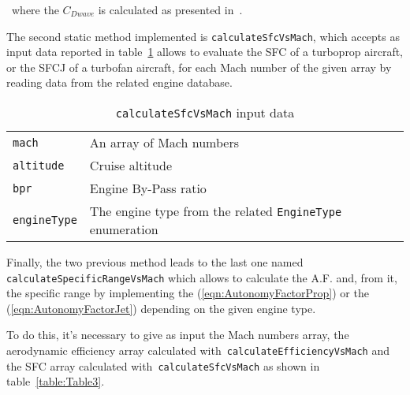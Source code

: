 \bigskip
\noindent
~where the $C_{Dwave}$ is calculated as presented in~\cite{hilton1951high}.

\bigskip
\noindent
The second static method implemented is \lstinline[language=Java]!calculateSfcVsMach!, which accepts as input data reported in table~\ref{table:Table2} allows to evaluate the SFC of a turboprop aircraft, or the SFCJ of a turbofan aircraft, for each Mach number of the given array by reading data from the related engine database.

\begin{table}[t]
\begin{tabular}{p{7cm}p{7.5cm}}
\toprule
\lstinline[language=Java]!mach!	& An array of Mach numbers \\[0.1cm]
\lstinline[language=Java]!altitude! & Cruise altitude \\[0.1cm]
\lstinline[language=Java]!bpr! & Engine By-Pass ratio \\[0.1cm]
\lstinline[language=Java]!engineType! & The engine type from the related \lstinline[language=Java]!EngineType! enumeration \\
\bottomrule
\end{tabular}
\caption{ \lstinline[language=Java]!calculateSfcVsMach! input data}
\label{table:Table2}
\end{table}

\bigskip
\noindent
Finally, the two previous method leads to the last one named \lstinline[language=Java]!calculateSpecificRangeVsMach! which allows to calculate the A.F. and, from it, the specific range by implementing the (\ref{eqn:AutonomyFactorProp}) or the (\ref{eqn:AutonomyFactorJet}) depending on the given engine type. 

To do this, it's necessary to give as input the Mach numbers array, the aerodynamic efficiency array calculated with~\lstinline[language=Java]!calculateEfficiencyVsMach! and the SFC array calculated with~\lstinline[language=Java]!calculateSfcVsMach! as shown in table~\ref{table:Table3}.

